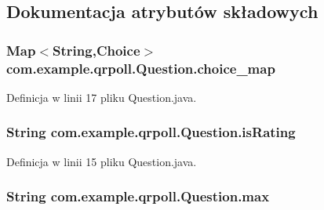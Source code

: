 \subsection{Dokumentacja atrybutów składowych}
\hypertarget{classcom_1_1example_1_1qrpoll_1_1_question_aa382153815db46e065ab637ef86f9265}{
\subsubsection[{choice\+\_\+map}]{\setlength{\rightskip}{0pt plus 5cm}Map$<$String,{\bf Choice}$>$ com.\+example.\+qrpoll.\+Question.\+choice\+\_\+map\hspace{0.3cm}{\ttfamily [private]}}}\label{classcom_1_1example_1_1qrpoll_1_1_question_aa382153815db46e065ab637ef86f9265}


Definicja w linii 17 pliku Question.\+java.

\hypertarget{classcom_1_1example_1_1qrpoll_1_1_question_a7b9016a004baf976a3d700ce332c0e1b}{
\subsubsection[{is\+Rating}]{\setlength{\rightskip}{0pt plus 5cm}String com.\+example.\+qrpoll.\+Question.\+is\+Rating\hspace{0.3cm}{\ttfamily [private]}}}\label{classcom_1_1example_1_1qrpoll_1_1_question_a7b9016a004baf976a3d700ce332c0e1b}


Definicja w linii 15 pliku Question.\+java.

\hypertarget{classcom_1_1example_1_1qrpoll_1_1_question_a07bd283882253cc7c9ab69718a692a64}{
\subsubsection[{max}]{\setlength{\rightskip}{0pt plus 5cm}String com.\+example.\+qrpoll.\+Question.\+max\hspace{0.3cm}{\ttfamily [private]}}}\label{classcom_1_1example_1_1qrpoll_1_1_question_a07bd283882253cc7c9ab69718a692a64}


